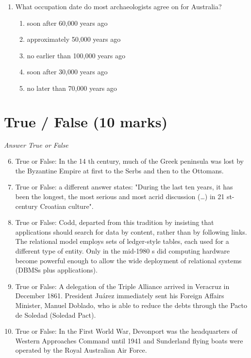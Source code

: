 \documentclass[12pt]{article}
\begin{document}
\begin{enumerate}[label=\arabic*.]
\begin{enumerate}[label=(\alph*)]
    \item a shared ability to use complex tools
    \item a similar diet
    \item a reliance on brachiation
    \item an identical social structure
    \item a mode of locomotion
\end{enumerate}
\item What occupation date do most archaeologists agree on for Australia?
\begin{enumerate}[label=(\alph*)]
    \item soon after 60,000 years ago
    \item approximately 50,000 years ago
    \item no earlier than 100,000 years ago
    \item soon after 30,000 years ago
    \item no later than 70,000 years ago
\end{enumerate}
\end{enumerate}

\section*{True / False (10 marks)}
\textit{Answer True or False}
\begin{enumerate}[label=\arabic*.]
\setcounter{enumi}{5}
\item True or False: In the 14 th century, much of the Greek peninsula was lost by the Byzantine Empire at first to the Serbs and then to the Ottomans.
\item True or False: a different answer states: "During the last ten years, it has been the longest, the most serious and most acrid discussion (…) in 21 st-century Croatian culture".
\item True or False: Codd, departed from this tradition by insisting that applications should search for data by content, rather than by following links. The relational model employs sets of ledger-style tables, each used for a different type of entity. Only in the mid-1980 s did computing hardware become powerful enough to allow the wide deployment of relational systems (DBMSs plus applications).
\item True or False: A delegation of the Triple Alliance arrived in Veracruz in December 1861. President Juárez immediately sent his Foreign Affairs Minister, Manuel Doblado, who is able to reduce the debts through the Pacto de Soledad (Soledad Pact).
\item True or False: In the First World War, Devonport was the headquarters of Western Approaches Command until 1941 and Sunderland flying boats were operated by the Royal Australian Air Force.
\end{enumerate}
\end{document}
